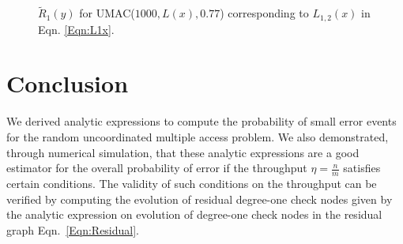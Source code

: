 \begin{figure}[!ht]
\centering
\resizebox{0.9\textwidth}{!}{}
\caption{$\tilde{R}_{1}(y)$ for UMAC($1000,L(x),0.77$) corresponding to $L_{1,2}(x)$ in Eqn. \eqref{Eqn:L1x}.}
\label{Fig:UMAC_Residual}
\end{figure}


\section{Conclusion}
We derived analytic expressions to compute the probability of small error events for the random uncoordinated multiple access problem. We also demonstrated, through numerical simulation, that these analytic expressions are a good estimator for the overall probability of error if the throughput $\eta=\frac{n}{m}$ satisfies certain conditions. The validity of such conditions on the throughput can be verified by computing the evolution of residual degree-one check nodes given by the analytic expression on evolution of degree-one check nodes in the residual graph Eqn.~\eqref{Eqn:Residual}.
